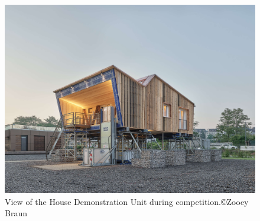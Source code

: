 \documentclass[twocolumn, a4paper,10pt]{article}
\begin{document}
\vspace{-2pt} 
\begin{figure}[H]
\centering
\includegraphics[trim={8cm 4cm 10cm 12cm}, clip, scale=0.11]{img/Zooey-Braun701-01-1-scaled.jpg}
\vspace{2pt} 
\caption{View of the House Demonstration Unit during competition.\copyright Zooey Braun}
\label{fig:HDU}
\end{figure}
\vspace{-2pt} 

\end{document}
